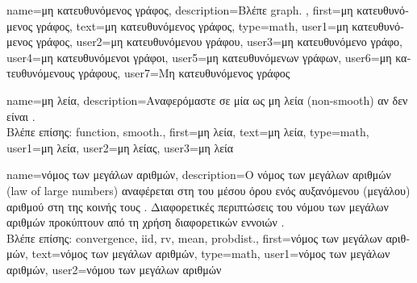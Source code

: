 {name={\foreignlanguage{greek}{μη κατευθυνόμενος γράφος}},
	description={\foreignlanguage{greek}{Βλέπε} \gls{graph}. },
	first={\foreignlanguage{greek}{μη κατευθυνόμενος γράφος}},
	text={\foreignlanguage{greek}{μη κατευθυνόμενος γράφος}},
	type=math,
	user1={\foreignlanguage{greek}{μη κατευθυνόμενος γράφος}}, %
  	user2={\foreignlanguage{greek}{μη κατευθυνόμενου γράφου}}, %
	user3={\foreignlanguage{greek}{μη κατευθυνόμενο γράφο}}, %
	user4={\foreignlanguage{greek}{μη κατευθυνόμενοι γράφοι}}, %
  	user5={\foreignlanguage{greek}{μη κατευθυνόμενων γράφων}}, %
	user6={\foreignlanguage{greek}{μη κατευθυνόμενους γράφους}}, %
	user7={\foreignlanguage{greek}{Μη κατευθυνόμενος γράφος}} %
}

{name={\foreignlanguage{greek}{μη λεία}},
	description={\foreignlanguage{greek}{Αναφερόμαστε σε μία} 
		 \foreignlanguage{greek}{ως μη λεία} (non-smooth) \foreignlanguage{greek}{αν δεν είναι} 
		 \cite{nesterov04}.
		\\
		\foreignlanguage{greek}{Βλέπε επίσης:} \gls{function}, \gls{smooth}.},
	first={\foreignlanguage{greek}{μη λεία}},
	text={\foreignlanguage{greek}{μη λεία}},
	type=math,
	user1={\foreignlanguage{greek}{μη λεία}}, %
	user2={\foreignlanguage{greek}{μη λείας}}, %
	user3={\foreignlanguage{greek}{μη λεία}} %
}

{name={\foreignlanguage{greek}{νόμος των μεγάλων αριθμών}},
	description={\foreignlanguage{greek}{Ο νόμος των μεγάλων αριθ\-μών} 
		(law of large numbers) \foreignlanguage{greek}{αναφέρεται στη}  \foreignlanguage{greek}{του μέσου όρου 
		ενός αυξανόμενου (μεγάλου) αριθ\-μού}   \foreignlanguage{greek}{στη}  
		\foreignlanguage{greek}{της κοινής τους} . \foreignlanguage{greek}{Διαφορετικές περιπτώσεις του νόμου των 
		μεγάλων αριθμών προκύπτουν από τη χρήση διαφορετικών εννοιών}  \cite{papoulis}.
		\\
		\foreignlanguage{greek}{Βλέπε επίσης:} \gls{convergence}, \gls{iid}, \gls{rv}, \gls{mean}, \gls{probdist}.},
	first={\foreignlanguage{greek}{νόμος των μεγάλων αριθμών}},
	text={\foreignlanguage{greek}{νόμος των μεγάλων αριθμών}},
	type=math,
	user1={\foreignlanguage{greek}{νόμος των μεγάλων αριθμών}}, %
	user2={\foreignlanguage{greek}{νόμου των μεγάλων αριθμών}} %
}

